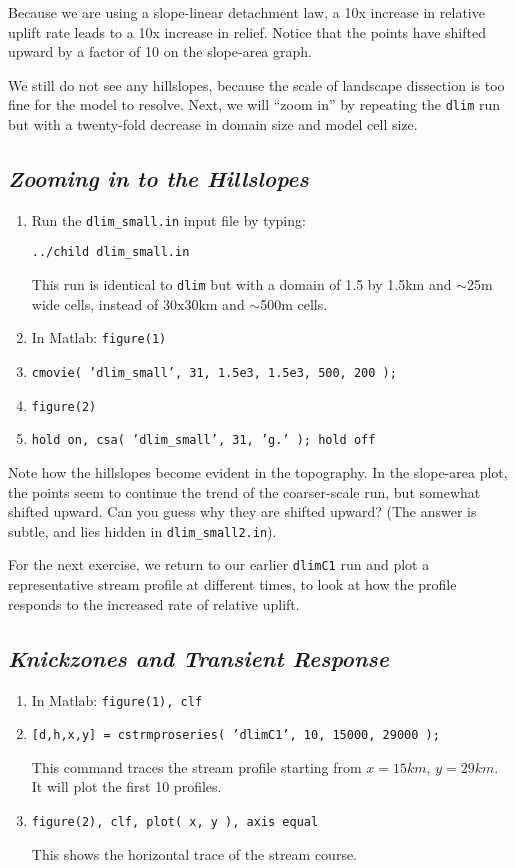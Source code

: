 \documentclass[12pt]{amsart}
\begin{document}
Because we are using a slope-linear detachment law, a 10x increase in relative uplift rate leads to a 10x increase in relief. Notice that the points have shifted upward by a factor of 10 on the slope-area graph.

We still do not see any hillslopes, because the scale of landscape dissection is too fine for the model to resolve. Next, we will ``zoom in'' by repeating the {\tt dlim} run but with a twenty-fold decrease in domain size and model cell size.

\subsection*{\em Zooming in to the Hillslopes}

{ \em
\begin{enumerate}
\item
Run the {\tt dlim\_small.in} input file by typing:

{\tt ../child dlim\_small.in}

This run is identical to {\tt dlim} but with a domain of 1.5 by 1.5km and $\sim$25m wide cells, instead of 30x30km and $\sim$500m cells.
\item
In Matlab: {\tt figure(1)}
\item
{\tt cmovie( 'dlim\_small', 31, 1.5e3, 1.5e3, 500, 200 );}
\item
{\tt figure(2)}
\item
{\tt hold on, csa( 'dlim\_small', 31, 'g.' ); hold off}
\end{enumerate}
}

Note how the hillslopes become evident in the topography. In the slope-area plot, the points seem to continue the trend of the coarser-scale run, but somewhat shifted upward. Can you guess why they are shifted upward? (The answer is subtle, and lies hidden in {\tt dlim\_small2.in}).

For the next exercise, we return to our earlier {\tt dlimC1} run and plot a representative stream profile at different times, to look at how the profile responds to the increased rate of relative uplift.

\subsection*{\em Knickzones and Transient Response}

{ \em
\begin{enumerate}
\item
In Matlab: {\tt figure(1), clf}
\item
{\tt [d,h,x,y] = cstrmproseries( 'dlimC1', 10, 15000, 29000 );}

\noindent
This command traces the stream profile starting from $x=15km$, $y=29km$. It will plot the first 10 profiles.
\item
{\tt figure(2), clf, plot( x, y ), axis equal}

\noindent
This shows the horizontal trace of the stream course.
\end{enumerate}
}
\end{document}
